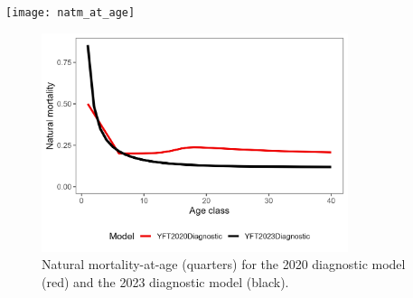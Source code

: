 \documentclass{article}
\begin{document}
\texttt{[image: natm\_at\_age]}

\begin{figure}[!ht]
  \centering
  \includegraphics[width=0.8\textwidth]{figs/natm_at_age.png}
  \caption{Natural mortality-at-age (quarters) for the 2020 diagnostic model (red) and the 2023 diagnostic model (black). \label{fig:natm_at_age}}
\end{figure}
\end{document}
